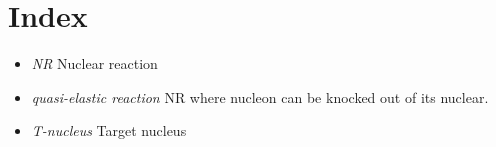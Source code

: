 \section{Index}

\begin{itemize}
\item {\it NR} Nuclear reaction
\item {\it quasi-elastic reaction} NR where nucleon can be knocked out of its nuclear. 

\item {\it T-nucleus} Target nucleus 
\end{itemize}

